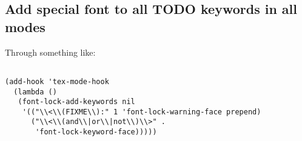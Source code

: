 \documentclass[11pt]{article}
\begin{document}
\subsection{Add special font to all TODO keywords in all modes}
\label{sec:org9415def}
Through something like:

\begin{verbatim}

(add-hook 'tex-mode-hook
  (lambda ()
   (font-lock-add-keywords nil
    '(("\\<\\(FIXME\\):" 1 'font-lock-warning-face prepend)
      ("\\<\\(and\\|or\\|not\\)\\>" .
       'font-lock-keyword-face)))))


\end{verbatim}
\end{document}
